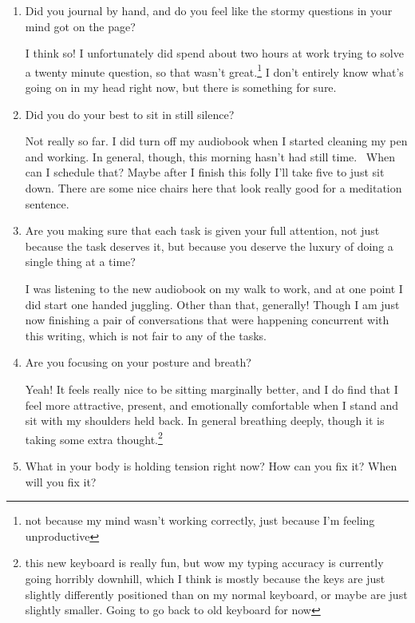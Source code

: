 \documentclass[12pt]{article}
\renewcommand{\,}{\textsuperscript{,}}
\begin{document}
\begin{enumerate}

\item Did you journal by hand, and do you feel like the stormy questions in your mind got on the page?

I think so! I unfortunately did spend about two hours at work trying to solve a twenty minute question, so that wasn't great.\footnote{not because my mind wasn't working correctly, just because I'm feeling unproductive}  
I don't entirely know what's going on in my head right now, but there is something for sure.

\item Did you do your best to sit in still silence?

Not really so far. I did turn off my audiobook when I started cleaning my pen and working.  
In general, though, this morning hasn't had still time.   
When can I schedule that? Maybe after I finish this folly I'll take five to just sit down. There are some nice chairs here that look really good for a meditation sentence.

\item Are you making sure that each task is given your full attention, not just because the task deserves it, but because you deserve the luxury of doing a single thing at a time?

I was listening to the new audiobook on my walk to work, and at one point I did start one handed juggling. Other than that, generally! Though I am just now finishing a pair of conversations that were happening concurrent with this writing, which is not fair to any of the tasks.

\item Are you focusing on your posture and breath?

Yeah! It feels really nice to be sitting marginally better, and I do find that I feel more attractive, present, and emotionally comfortable when I stand and sit with my shoulders held back.  
In general breathing deeply, though it is taking some extra thought.\footnote{this new keyboard is really fun, but wow my typing accuracy is currently going horribly downhill, which I think is mostly because the keys are just slightly differently positioned than on my normal keyboard, or maybe are just slightly smaller. Going to go back to old keyboard for now}

\item What in your body is holding tension right now? How can you fix it? When will you fix it?


\end{enumerate}
\end{document}
